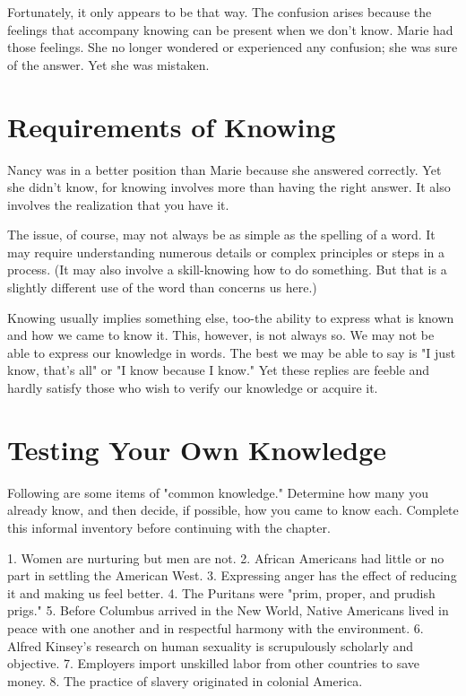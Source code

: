 \documentclass{book}
\begin{document}
Fortunately, it only appears to be that way. The confusion arises because the feelings that accompany knowing can be present when we don’t know. Marie had those feelings. She no longer wondered or experienced any confusion; she was sure of the answer. Yet she was mistaken.

\section{Requirements of Knowing}

Nancy was in a better position than Marie because she answered correctly. Yet she didn’t know, for knowing involves more than having the right answer. It also involves the realization that you have it.

The issue, of course, may not always be as simple as the spelling of a word. It may require understanding numerous details or complex principles or steps in a process. (It may also involve a skill-knowing how to do something. But that is a slightly different use of the word than concerns us here.)

Knowing usually implies something else, too-the ability to express what is known and how we came to know it. This, however, is not always so. We may not be able to express our knowledge in words. The best we may be able to say is "I just know, that’s all" or "I know because I know." Yet these replies are feeble and hardly satisfy those who wish to verify our knowledge or acquire it.

\section{Testing Your Own Knowledge}

Following are some items of "common knowledge." Determine how many you already know, and then decide, if possible, how you came to know each. Complete this informal inventory before continuing with the chapter.

1. Women are nurturing but men are not.
2. African Americans had little or no part in settling the American West.
3. Expressing anger has the effect of reducing it and making us feel better.
4. The Puritans were "prim, proper, and prudish prigs."
5. Before Columbus arrived in the New World, Native Americans lived in peace with one another and in respectful harmony with the environment.
6. Alfred Kinsey’s research on human sexuality is scrupulously scholarly and objective.
7. Employers import unskilled labor from other countries to save money.
8. The practice of slavery originated in colonial America.
\end{document}
